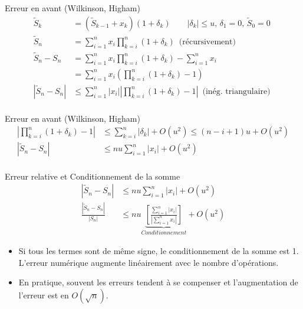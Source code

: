 \documentclass{beamer}
\begin{document}
\begin{frame}{Erreur en avant (Wilkinson, Higham)}
    \begin{align*}
        \widetilde{S}_k                                & = (\widetilde{S}_{k-1}+x_k)(1+\delta_k) \qquad |\delta_k| \le u,\, \delta_1 = 0,\, \widetilde{S}_0 = 0 \\
        \widetilde{S}_n                                & = \sum_{i=1}^n x_i \prod_{k=i}^{n}(1+\delta_k) \, \text { (récursivement) }                            \\
        \widetilde{S}_n - S_n                          & = \sum_{i=1}^n x_i \prod_{k=i}^{n}(1+\delta_k) - \sum_{i=1}^n x_i  \\
                                                       & = \sum_{i=1}^n x_i (\prod_{k=i}^{n}(1+\delta_k) - 1) \\
        \left|\widetilde{S}_n - S_n \right|            & \le \sum_{i=1}^n |x_i| \left|\prod_{k=i}^{n}(1+\delta_k) - 1 \right|\, \text { (inég. triangulaire) }  \\
    \end{align*}
\end{frame}


\begin{frame}{Erreur en avant (Wilkinson, Higham)}
    \begin{align*}
        \left| \prod_{k=i}^n{(1+\delta_k)} - 1 \right| & \le \sum_{k=i}^n{|\delta_k|} + O(u^2) \le (n-i+1)u + O(u^2)                                \\
        \left|\widetilde{S}_n - S_n \right|            & \le nu\sum_{i=1}^n{|x_i|} + O(u^2)                                                         \\
    \end{align*}
\end{frame}



\begin{frame}{Erreur relative et Conditionnement de la somme}
    \begin{align*}
        \left|\widetilde{S}_n - S_n \right|               & \le nu\sum_{i=1}^n{|x_i|} + O(u^2)                                                                                           \\
        \frac{\left|\widetilde{S}_n - S_n \right|}{|S_n|} & \le   nu \underbrace{\left[\frac{\sum_{i=1}^n{|x_i|}}{ \left|\sum_{i=1}^n{x_i} \right|} \right]}_{Conditionnement}  + O(u^2)
    \end{align*}

    \begin{itemize}
        \item Si tous les termes sont de même signe, le conditionnement de la somme est 1.
              L'erreur numérique augmente linéairement avec le nombre d'opérations.
        \item En pratique, souvent les erreurs tendent à se compenser et l'augmentation de l'erreur est en $O(\sqrt{n})$.
    \end{itemize}
\end{frame}
\end{document}
